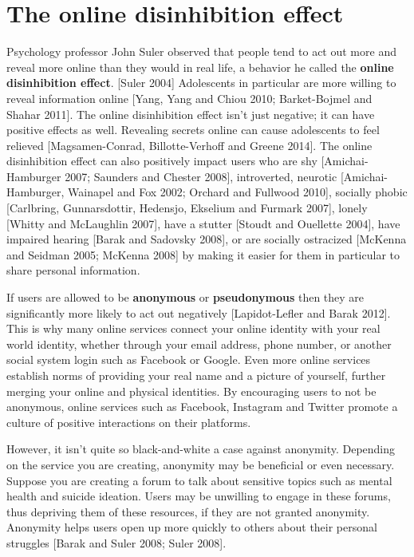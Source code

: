 \documentclass[class=book, crop=false]{standalone}
\providecommand{\keyterm}[1]{\textbf{#1}\marginnote{\scriptsize \textbf{#1}}}
\begin{document}
\section{The online disinhibition effect}

Psychology professor John Suler observed that people tend to act out more and reveal more online than they would in real life, a behavior he called the \keyterm{online disinhibition effect}. [Suler 2004] Adolescents in particular are more willing to reveal information online [Yang, Yang and Chiou 2010; Barket-Bojmel and Shahar 2011]. The online disinhibition effect isn’t just negative; it can have positive effects as well. Revealing secrets online can cause adolescents to feel relieved [Magsamen-Conrad, Billotte-Verhoff and Greene 2014]. The online disinhibition effect can also positively impact users who are shy [Amichai-Hamburger 2007; Saunders and Chester 2008], introverted, neurotic [Amichai-Hamburger, Wainapel and Fox 2002; Orchard and Fullwood 2010], socially phobic [Carlbring, Gunnarsdottir, Hedensjo, Ekselium and Furmark 2007], lonely [Whitty and McLaughlin 2007], have a stutter [Stoudt and Ouellette 2004], have impaired hearing [Barak and Sadovsky 2008], or are socially ostracized [McKenna and Seidman 2005; McKenna 2008] by making it easier for them in particular to share personal information.

If users are allowed to be \keyterm{anonymous} or \keyterm{pseudonymous} then they are significantly more likely to act out negatively [Lapidot-Lefler and Barak 2012]. This is why many online services connect your online identity with your real world identity, whether through your email address, phone number, or another social system login such as Facebook or Google. Even more online services establish norms of providing your real name and a picture of yourself, further merging your online and physical identities. By encouraging users to not be anonymous, online services such as Facebook, Instagram and Twitter promote a culture of positive interactions on their platforms.

However, it isn’t quite so black-and-white a case against anonymity. Depending on the service you are creating, anonymity may be beneficial or even necessary. Suppose you are creating a forum to talk about sensitive topics such as mental health and suicide ideation. Users may be unwilling to engage in these forums, thus depriving them of these resources, if they are not granted anonymity. Anonymity helps users open up more quickly to others about their personal struggles [Barak and Suler 2008; Suler 2008].
\end{document}
